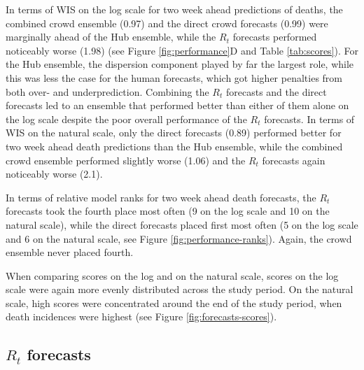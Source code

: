 \documentclass[10pt,a4paper,twocolumn]{article}
\begin{document}
In terms of WIS on the log scale for two week ahead predictions of deaths, the combined crowd ensemble (0.97) and the direct crowd forecasts (0.99) were marginally ahead of the Hub ensemble, while the $R_t$ forecasts performed noticeably worse (1.98) (see Figure \ref{fig:performance}D and Table \ref{tab:scores}). For the Hub ensemble, the dispersion component played by far the largest role, while this was less the case for the human forecasts, which got higher penalties from both over- and underprediction. Combining the $R_t$ forecasts and the direct forecasts led to an ensemble that performed better than either of them alone on the log scale despite the poor overall performance of the $R_t$ forecasts. 
In terms of WIS on the natural scale, only the direct forecasts (0.89) performed better for two week ahead death predictions than the Hub ensemble, while the combined crowd ensemble performed slightly worse (1.06) and the $R_t$ forecasts again noticeably worse (2.1). 

In terms of relative model ranks for two week ahead death forecasts, the $R_t$ forecasts took the fourth place most often (9 on the log scale and 10 on the natural scale), while the direct forecasts placed first most often (5 on the log scale and 6 on the natural scale, see Figure \ref{fig:performance-ranks}). Again, the crowd ensemble never placed fourth.  

When comparing scores on the log and on the natural scale, scores on the log scale were again more evenly distributed across the study period. On the natural scale, high scores were concentrated around the end of the study period, when death incidences were highest (see Figure \ref{fig:forecasts-scores}). 

\subsection*{$R_t$ forecasts}
\end{document}
